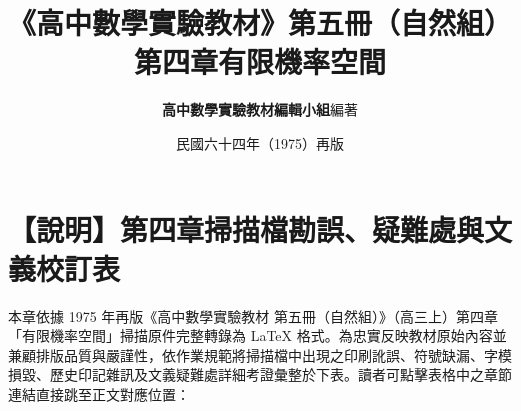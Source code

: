 \documentclass[a4paper,12pt,twoside]{article}
\title{\LARGE\textbf{《高中數學實驗教材》第五冊（自然組）}\\[0.5em] \Large\textbf{第四章\quad 有限機率空間}}
\author{\textbf{高中數學實驗教材編輯小組}\quad 編著}
\date{民國六十四年（1975）再版}
\begin{document}
\maketitle
\thispagestyle{firstpage}

\section*{【說明】第四章掃描檔勘誤、疑難處與文義校訂表}
\label{sec:errata_notes_b5_ch4}

本章依據 1975 年再版《高中數學實驗教材 第五冊（自然組）》（高三上）第四章「有限機率空間」掃描原件完整轉錄為 \LaTeX{} 格式。為忠實反映教材原始內容並兼顧排版品質與嚴謹性，依作業規範將掃描檔中出現之印刷訛誤、符號缺漏、字模損毀、歷史印記雜訊及文義疑難處詳細考證彙整於下表。讀者可點擊表格中之章節連結直接跳至正文對應位置：
\end{document}
